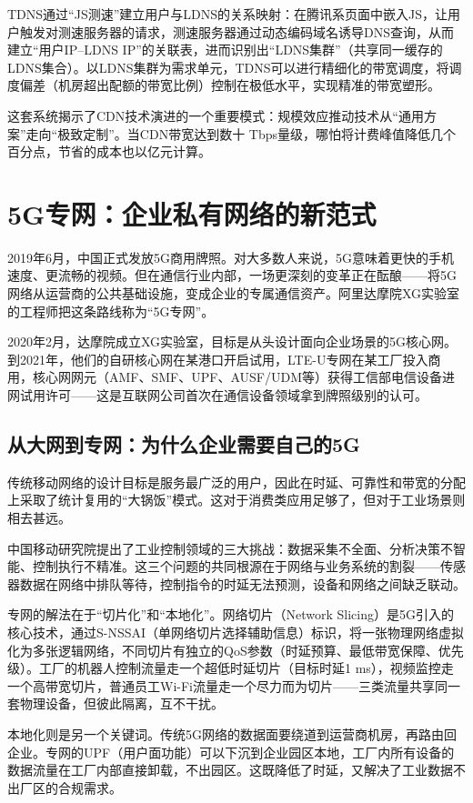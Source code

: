 TDNS通过``JS测速''建立用户与LDNS的关系映射：在腾讯系页面中嵌入JS，让用户触发对测速服务器的请求，测速服务器通过动态编码域名诱导DNS查询，从而建立``用户IP--LDNS IP''的关联表，进而识别出``LDNS集群''（共享同一缓存的LDNS集合）。以LDNS集群为需求单元，TDNS可以进行精细化的带宽调度，将调度偏差（机房超出配额的带宽比例）控制在极低水平，实现精准的带宽塑形。

这套系统揭示了CDN技术演进的一个重要模式：规模效应推动技术从``通用方案''走向``极致定制''。当CDN带宽达到数十 Tbps量级，哪怕将计费峰值降低几个百分点，节省的成本也以亿元计算。

\section{5G专网：企业私有网络的新范式}

2019年6月，中国正式发放5G商用牌照。对大多数人来说，5G意味着更快的手机速度、更流畅的视频。但在通信行业内部，一场更深刻的变革正在酝酿——将5G网络从运营商的公共基础设施，变成企业的专属通信资产。阿里达摩院XG实验室的工程师把这条路线称为``5G专网''。

2020年2月，达摩院成立XG实验室，目标是从头设计面向企业场景的5G核心网。到2021年，他们的自研核心网在某港口开启试用，LTE-U专网在某工厂投入商用，核心网网元（AMF、SMF、UPF、AUSF/UDM等）获得工信部电信设备进网试用许可——这是互联网公司首次在通信设备领域拿到牌照级别的认可。

\subsection{从大网到专网：为什么企业需要自己的5G}

传统移动网络的设计目标是服务最广泛的用户，因此在时延、可靠性和带宽的分配上采取了统计复用的``大锅饭''模式。这对于消费类应用足够了，但对于工业场景则相去甚远。

中国移动研究院提出了工业控制领域的三大挑战：数据采集不全面、分析决策不智能、控制执行不精准。这三个问题的共同根源在于网络与业务系统的割裂——传感器数据在网络中排队等待，控制指令的时延无法预测，设备和网络之间缺乏联动。

专网的解法在于``切片化''和``本地化''。网络切片（Network Slicing）是5G引入的核心技术，通过S-NSSAI（单网络切片选择辅助信息）标识，将一张物理网络虚拟化为多张逻辑网络，不同切片有独立的QoS参数（时延预算、最低带宽保障、优先级）。工厂的机器人控制流量走一个超低时延切片（目标时延1 ms），视频监控走一个高带宽切片，普通员工Wi-Fi流量走一个尽力而为切片——三类流量共享同一套物理设备，但彼此隔离，互不干扰。

本地化则是另一个关键词。传统5G网络的数据面要绕道到运营商机房，再路由回企业。专网的UPF（用户面功能）可以下沉到企业园区本地，工厂内所有设备的数据流量在工厂内部直接卸载，不出园区。这既降低了时延，又解决了工业数据不出厂区的合规需求。

